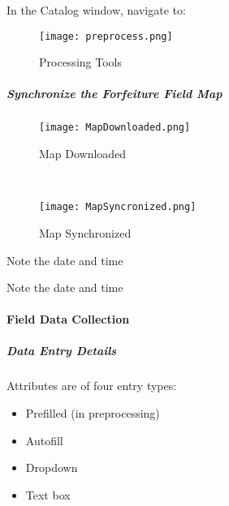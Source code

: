  In the Catalog window, navigate to:

 {\scriptsize{}}

 \begin{wrapfigure}{r}{0.5\textwidth}
 \centering
     \texttt{[image: preprocess.png]}
 \vspace{-.1in}

 \caption{Processing Tools}
 \end{wrapfigure}
 \vspace{.5in}

 {\LARGE\noindent{}  \lookArrow}
 \vspace{2in}

 {\LARGE\noindent{} \lookArrow}


 \clearpage


 \subparagraph{Synchronize the Forfeiture Field Map}

 \begin{wrapfigure}{r}{0.5\textwidth}
 \centering
     \texttt{[image: MapDownloaded.png]}
 \caption{Map Downloaded}
 \vspace{.25in}

 \HRule \\[.4cm] %
 \vspace{.25in}

     \texttt{[image: MapSyncronized.png]}
 \caption{Map Synchronized}
 \end{wrapfigure}
 Note the date and time
 \vspace{1in}

 \vspace{3in}

 \noindent Note the date and time
 \vspace{1in}

 \clearpage

 \paragraph{Field Data Collection}
 \subparagraph{Data Entry Details}

 Attributes are of four entry types:
 \begin{itemize}
 \item Prefilled {\scriptsize (in preprocessing)}
 \item Autofill
 \item Dropdown
 \item Text box
 \end{itemize}
 \vspace{1in}

